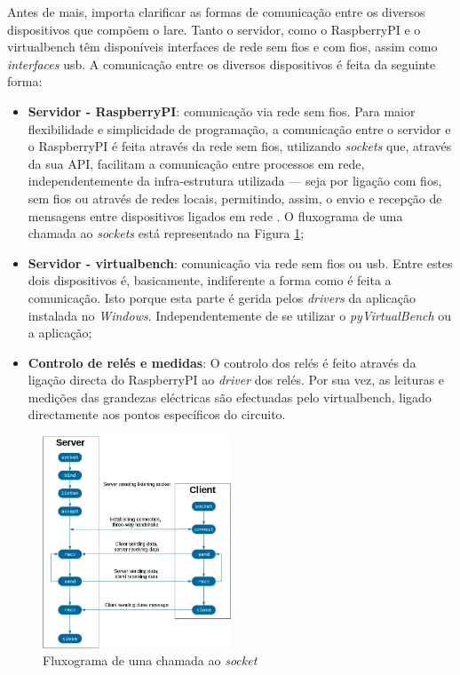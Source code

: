 Antes de mais, importa clarificar as formas de comunicação entre os diversos dispositivos que compõem o \acrshort{lare}. Tanto o servidor, como o \gls{RaspberryPI} e o \acrshort{virtualbench} têm disponíveis interfaces de rede sem fios e com fios, assim como \textit{interfaces} \acrshort{usb}. A comunicação entre os diversos dispositivos é feita da seguinte forma:
\begin{itemize}
    \item \textbf{Servidor - \gls{RaspberryPI}}: comunicação via rede sem fios. Para maior flexibilidade e simplicidade de programação, a comunicação entre o servidor e o \gls{RaspberryPI} é feita através da rede sem fios, utilizando \textit{sockets} que, através da sua API, facilitam a comunicação entre processos em rede, independentemente da infra-estrutura utilizada — seja por ligação com fios, sem fios ou através de redes locais, permitindo, assim, o envio e recepção de mensagens entre dispositivos ligados em rede \cite{Sockets}. O fluxograma de uma chamada ao \textit{sockets} está representado na Figura \ref{fig:fluxogramasockets};
    \item \textbf{Servidor - \acrshort{virtualbench}}: comunicação via rede sem fios ou \acrshort{usb}. Entre estes dois dispositivos é, basicamente, indiferente a forma como é feita a comunicação. Isto porque esta parte é gerida pelos \textit{drivers} da aplicação instalada no \textit{Windows}. Independentemente de se utilizar o \textit{pyVirtualBench} ou a aplicação;
    \item \textbf{Controlo de relés e medidas}: O controlo dos relés é feito através da ligação directa do \gls{RaspberryPI} ao \textit{driver} dos relés. Por sua vez, as leituras e medições das grandezas eléctricas são efectuadas pelo \acrshort{virtualbench}, ligado directamente aos pontos específicos do circuito.
\end{itemize}

\begin{figure}[hbtp]
    \centering
    \includegraphics[width=0.5\textwidth]{figures/socketsdiagrama.png}
    \caption{Fluxograma de uma chamada ao \textit{socket} \cite{Sockets}}
    \label{fig:fluxogramasockets}
\end{figure}

